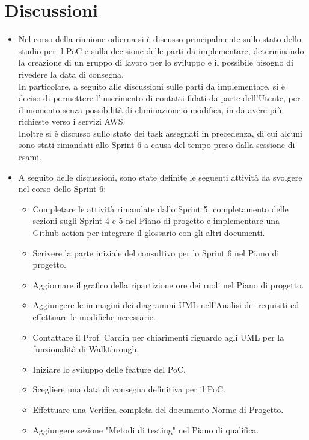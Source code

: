 \documentclass[a4paper,12pt]{article}
\begin{document}
\section{Discussioni}
\begin{itemize}
    \item Nel corso della riunione odierna si è discusso principalmente sullo stato dello studio per il PoC e sulla decisione delle parti da implementare, determinando la creazione di un gruppo di lavoro per lo sviluppo e il possibile bisogno di rivedere la data di consegna.\\
    In particolare, a seguito alle discussioni sulle parti da implementare, si è deciso di permettere l'inserimento di contatti fidati da parte dell'Utente, per il momento senza possibilità di eliminazione o modifica, in da avere più richieste verso i servizi AWS.\\
    Inoltre si è discusso sullo stato dei task assegnati in precedenza, di cui alcuni sono stati rimandati allo Sprint 6 a causa del tempo preso dalla sessione di esami. 
    \item A seguito delle discussioni, sono state definite le seguenti attività da svolgere nel corso dello Sprint 6:
    \begin{itemize}
        \item Completare le attività rimandate dallo Sprint 5: completamento delle sezioni sugli Sprint 4 e 5 nel Piano di progetto e implementare una Github action per integrare il glossario con gli altri documenti.
        \item Scrivere la parte iniziale del consultivo per lo Sprint 6 nel Piano di progetto.
        \item Aggiornare il grafico della ripartizione ore dei ruoli nel Piano di progetto.
        \item Aggiungere le immagini dei diagrammi UML nell'Analisi dei requisiti ed effettuare le modifiche necessarie.
        \item Contattare il Prof. Cardin per chiarimenti riguardo agli UML per la funzionalità di Walkthrough.
        \item Iniziare lo sviluppo delle feature del PoC.
        \item Scegliere una data di consegna definitiva per il PoC.
        \item Effettuare una Verifica completa del documento Norme di Progetto.
        \item Aggiungere sezione "Metodi di testing" nel Piano di qualifica.

\end{itemize}
\end{itemize}
\end{document}
